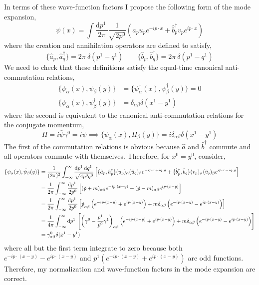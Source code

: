 \documentclass[12pt]{article}
\renewcommand{\d}[1]{ \mathrm{d}#1 \:}
\renewcommand{\a}{\hat{a}}
\newcommand{\adag}{\hat{a}^\dagger}
\renewcommand{\b}{\hat{b}}
\newcommand{\bdag}{\hat{b}^\dagger}
\begin{document}
In terms of these wave-function factors I propose the following form of the mode expansion,
\[ \psi(x) = \int \frac{\d{p^1}}{2 \pi} \frac{1}{\sqrt{2 p^0}} \left( \a_p u_p e^{-i p \cdot x} + \bdag_p v_p e^{i p \cdot x} \right) \]
where the creation and annihilation operators are defined to satisfy,
\[ \{ \a_p, \adag_q \} = 2 \pi \: \delta(p^1 - q^1) \quad \quad \{ \b_p, \bdag_q \} = 2 \pi \: \delta(p^1 - q^1) \]
We need to check that these definitions satisfy the equal-time canonical anti-commutation relations,
\begin{align*}
\{ \psi_{\alpha}(x), \psi_\beta(y) \} & = \{ \psi_{\alpha}^\dagger(x), \psi_{\beta}^\dagger(y) \} =  0 
\\
\{ \psi_{\alpha}(x), \psi_{\beta}^\dagger(y) \} & = \delta_{\alpha \beta} \delta(x^1 - y^1)
\end{align*}
where the second is equivalent to the canonical anti-commutation relations for the conjugate momentum, 
\[\Pi = i \bar{\psi} \gamma^0 = i \psi \implies \{ \psi_\alpha(x), \Pi_{\beta}(y) \} = i \delta_{\alpha \beta} \delta(x^1 - y^1) \]
The first of the commutation relations is obvious because $\a$ and $\bdag$ commute and all operators commute with themselves. Therefore, for $x^0 = y^0$, consider,
\begin{align*}
\{ \psi_{\alpha}(x), \bar{\psi}_{\beta}(y) \} & = \frac{1}{(2 \pi)^2} \int_{-\infty}^{\infty} \frac{\d{p^1} \d{q^1}}{\sqrt{4 p^0 q^0}} \left[ \{ \a_p , \adag_p \} (u_p)_{\alpha} (\bar{u}_q)_{\beta} e^{-i p \cdot x + i q \cdot y} + \{ \bdag_p, \b_q \} (v_p)_{\alpha} (\bar{v}_q)_{\beta} e^{i p \cdot x - i q \cdot y} \right] 
\\
& = \frac{1}{2 \pi } \int_{-\infty}^{\infty} \frac{\d{p^1}}{2 p^0} \left[ (\slashed{p} + m)_{\alpha \beta} e^{-i p \cdot (x - y)} + (\slashed{p} - m)_{\alpha \beta} e^{i p \cdot (x - y)} \right] 
\\
& = \frac{1}{2 \pi } \int_{-\infty}^{\infty} \frac{\d{p^1}}{2 p^0} \left[ \slashed{p}_{\alpha \beta} \left( e^{-i p \cdot (x - y)} + e^{i p \cdot (x - y)} \right) + m \delta_{\alpha \beta} \left( e^{-i p \cdot (x - y)} - e^{i p \cdot (x - y)} \right) \right] 
\\
& = \frac{1}{4 \pi } \int_{-\infty}^{\infty} \d{p^1} \left[ \left( \gamma^0 - \frac{p^1}{p^0} \gamma^1 \right)_{\alpha \beta} \left( e^{-i p \cdot (x - y)} + e^{i p \cdot (x - y)} \right) + m \delta_{\alpha \beta} \left( e^{-i p \cdot (x - y)} - e^{i p \cdot (x - y)} \right) \right] 
\\
& = \gamma^0_{\alpha \beta} \delta(x^1 - y^1)
\end{align*} 
where all but the first term integrate to zero because both $e^{-i p \cdot (x - y)} - e^{i p \cdot (x - y)}$ and $p^1 (e^{-i p \cdot (x - y)} + e^{i p \cdot (x - y)})$ are odd functions. Therefore, my normalization and wave-function factors in the mode expansion are correct. 
\end{document}
